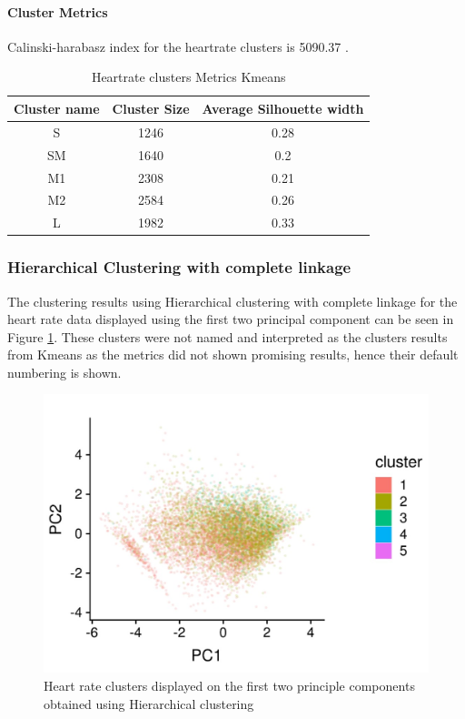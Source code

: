 \documentclass{article}
\begin{document}
\paragraph{Cluster Metrics}
Calinski-harabasz index for the heartrate clusters is 5090.37 .

\begin{table}[H]
  \caption{Heartrate clusters Metrics Kmeans}
  \label{hr_metrics}
  \centering
  \begin{tabular}{ c|c|c}
    \toprule
    \cmidrule(r){1-2}
    Cluster name & Cluster Size & Average Silhouette width \\
    \midrule
    S & 1246 & 0.28 \\
    SM & 1640 & 0.2 \\
    M1 & 2308 & 0.21 \\
    M2 & 2584 & 0.26 \\
    L & 1982 & 0.33 \\
    \bottomrule
    \end{tabular}
\end{table}

\subsubsection{Hierarchical Clustering with complete linkage}
\label{appendix:hrHC}

The clustering results using Hierarchical clustering with complete linkage for the heart rate data displayed using the first two principal component can be seen in Figure \ref{fig:hrClustersHC}. These clusters were not named and interpreted as the clusters results from Kmeans as the metrics did not shown promising results, hence their default numbering is shown.

\begin{figure}[H]
  \centering
  \includegraphics[]{hr_HC_results.jpg}
  \caption{Heart rate clusters displayed on the first two principle components obtained using Hierarchical clustering}
  \label{fig:hrClustersHC}
\end{figure}
\end{document}
